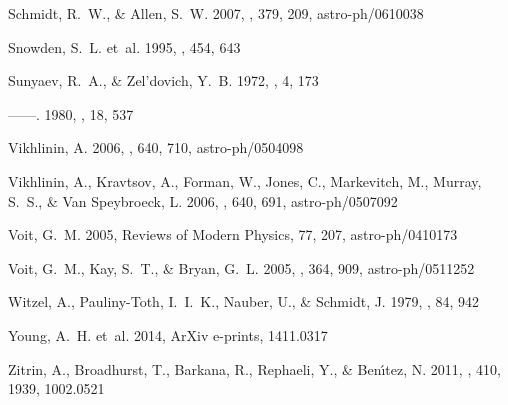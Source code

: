 \documentclass[twocolumn,traditabstract]{aa}
\begin{document}
\begin{thebibliography}{79}
{Schmidt}, R.~W., \& {Allen}, S.~W. 2007, \mnras, 379, 209, astro-ph/0610038

{Snowden}, S.~L. {et~al.} 1995, \apj, 454, 643

{Sunyaev}, R.~A., \& {Zel'dovich}, Y.~B. 1972, \apspr, 4, 173

------. 1980, \araa, 18, 537

{Vikhlinin}, A. 2006, \apj, 640, 710, astro-ph/0504098

{Vikhlinin}, A., {Kravtsov}, A., {Forman}, W., {Jones}, C., {Markevitch}, M.,
  {Murray}, S.~S., \& {Van Speybroeck}, L. 2006, \apj, 640, 691,
  astro-ph/0507092

{Voit}, G.~M. 2005, Reviews of Modern Physics, 77, 207, astro-ph/0410173

{Voit}, G.~M., {Kay}, S.~T., \& {Bryan}, G.~L. 2005, \mnras, 364, 909,
  astro-ph/0511252

{Witzel}, A., {Pauliny-Toth}, I.~I.~K., {Nauber}, U., \& {Schmidt}, J. 1979,
  \aj, 84, 942

{Young}, A.~H. {et~al.} 2014, ArXiv e-prints, 1411.0317

{Zitrin}, A., {Broadhurst}, T., {Barkana}, R., {Rephaeli}, Y., \&
  {Ben{\'{\i}}tez}, N. 2011, \mnras, 410, 1939, 1002.0521

\end{thebibliography}
\end{document}
